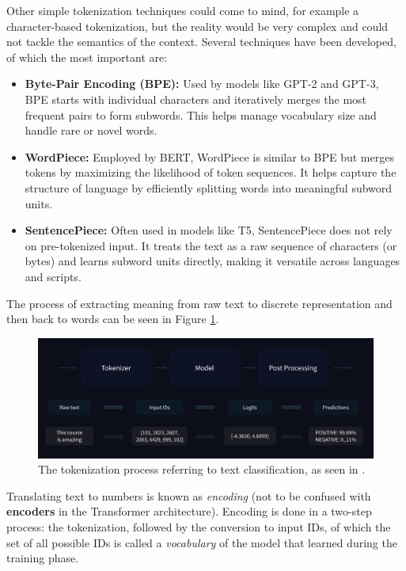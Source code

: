 Other simple tokenization techniques could come to mind, for example a character-based tokenization, but the reality would be very complex and could not tackle the semantics of the context. Several techniques have been developed, of which the most important are:\cite{rajaraman2024theorytokenizationllms}

\begin{itemize}
    \item \textbf{Byte-Pair Encoding (BPE):} Used by models like GPT-2 and GPT-3, BPE starts with individual characters and iteratively merges the most frequent pairs to form subwords. This helps manage vocabulary size and handle rare or novel words. \cite{sennrich2016neural}
    \item \textbf{WordPiece:} Employed by BERT, WordPiece is similar to BPE but merges tokens by maximizing the likelihood of token sequences. It helps capture the structure of language by efficiently splitting words into meaningful subword units.
    \item \textbf{SentencePiece:} Often used in models like T5, SentencePiece does not rely on pre-tokenized input. It treats the text as a raw sequence of characters (or bytes) and learns subword units directly, making it versatile across languages and scripts.
\end{itemize}

The process of extracting meaning from raw text to discrete representation and then back to words can be seen in Figure \ref{fig:tokenization}.

\begin{figure}[b]
    \centering
    \includegraphics[width=1\textwidth]{images/tokenizer-process.png}
    \caption{The tokenization process referring to text classification, as seen in \cite{huggingfacecourse}.}
    \label{fig:tokenization}
\end{figure}

Translating text to numbers is known as \textit{encoding} (not to be confused with \textbf{encoders} in the Transformer architecture). Encoding is done in a two-step process: the tokenization, followed by the conversion to input IDs, of which the set of all possible IDs is called a \textit{vocabulary} of the model that learned during the training phase.

